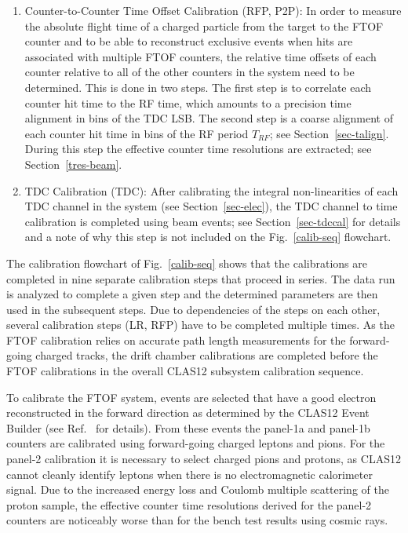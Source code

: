 \documentclass[3p,times,twocolumn]{elsarticle}
\begin{document}
\begin{enumerate}
\item Counter-to-Counter Time Offset Calibration (RFP, P2P): In order to measure the absolute flight time of a
charged particle from the target to the FTOF counter and to be able to reconstruct exclusive events when hits
are associated with multiple FTOF counters, the relative time offsets of each counter relative to all of the other
counters in the system need to be determined. This is done in two steps. The first step is to correlate each counter
hit time to the RF time, which amounts to a precision time alignment in bins of the TDC LSB. The second step is a
coarse alignment of each counter hit time in bins of the RF period $T_{RF}$; see Section~\ref{sec-talign}. During
this step the effective counter time resolutions are extracted; see Section~\ref{tres-beam}.

\item TDC Calibration (TDC): After calibrating the integral non-linearities of each TDC channel in the system
(see Section~\ref{sec-elec}), the TDC channel to time calibration is completed using beam events; see
Section~\ref{sec-tdccal} for details and a note of why this step is not included on the Fig.~\ref{calib-seq}
flowchart.

\end{enumerate}

The calibration flowchart of Fig.~\ref{calib-seq} shows that the calibrations are completed in nine separate
calibration steps that proceed in series. The data run is analyzed to complete a given step and the determined
parameters are then used in the subsequent steps. Due to dependencies of the steps on each other, several
calibration steps (LR, RFP) have to be completed multiple times. As the FTOF calibration relies on accurate
path length measurements for the forward-going charged tracks, the drift chamber calibrations are completed
before the FTOF calibrations in the overall CLAS12 subsystem calibration sequence.

To calibrate the FTOF system, events are selected that have a good electron reconstructed in the forward
direction as determined by the CLAS12 Event Builder (see Ref.~\cite{recon-nim} for details). From these events
the panel-1a and panel-1b counters are calibrated using forward-going charged leptons and pions. For the panel-2
calibration it is necessary to select charged pions and protons, as CLAS12 cannot cleanly identify leptons when
there is no electromagnetic calorimeter signal. Due to the increased energy loss and Coulomb multiple scattering
of the proton sample, the effective counter time resolutions derived for the panel-2 counters are noticeably
worse than for the bench test results using cosmic rays.
\end{document}
